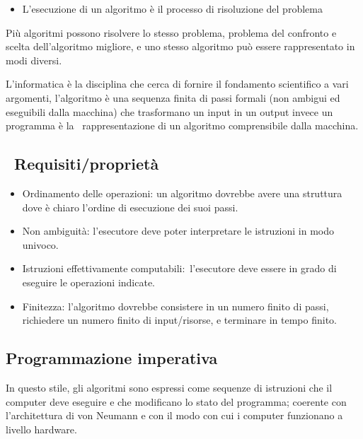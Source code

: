 \documentclass[
]{article}
\providecommand{\tightlist}{%
  \setlength{\itemsep}{0pt}\setlength{\parskip}{0pt}}
\begin{document}
\begin{itemize}
\tightlist
\item
  {L'esecuzione di un algoritmo è il processo di risoluzione del
  problema}
\end{itemize}

{}

{Più algoritmi possono risolvere lo stesso problema, problema del
confronto e scelta dell'algoritmo migliore, e uno stesso algoritmo può
essere rappresentato in modi diversi.}

{}

{L'informatica }{è la disciplina che cerca di fornire il fondamento
scientifico a vari argomenti, }{l'algoritmo }{è una sequenza finita di
passi formali (non ambigui ed eseguibili dalla macchina) che trasformano
un input in un output invece un }{programma }{è la ~rappresentazione di
un algoritmo comprensibile dalla macchina.}

\subsection{\texorpdfstring{{~Requisiti/proprietà}}{~Requisiti/proprietà}}\label{h.gnikcwz0r8qv}

\begin{itemize}
\tightlist
\item
  {Ordinamento delle operazioni}{: un algoritmo dovrebbe avere una
  struttura dove è chiaro l'ordine di esecuzione dei suoi passi.}
\item
  {Non ambiguità}{: l'esecutore deve poter interpretare le istruzioni in
  modo univoco.}
\item
  {Istruzioni effettivamente computabili:}{~l'esecutore deve essere in
  grado di eseguire le operazioni indicate.}
\item
  {Finitezza: }{l}{'algoritmo dovrebbe consistere in un numero finito di
  passi, richiedere un numero finito di input/risorse, e terminare in
  tempo finito.}
\end{itemize}

{}

\subsection{\texorpdfstring{{Programmazione
imperativa}}{Programmazione imperativa}}\label{h.uacwexl124zb}

{In questo stile, gli algoritmi sono espressi come sequenze di
istruzioni che il computer deve eseguire e che modificano lo stato del
programma; coerente con l'architettura di von Neumann e con il modo con
cui i computer funzionano a livello hardware.}
\end{document}
